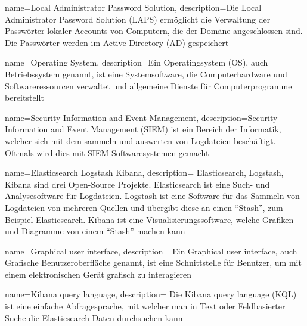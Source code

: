 {
    name=Local Administrator Password Solution,
    description={Die Local Administrator Password Solution (LAPS) ermöglicht die Verwaltung der Passwörter lokaler Accounts von Computern, die der Domäne angeschlossen sind. Die Passwörter werden im Active Directory (AD) gespeichert}
}

{
    name=Operating System,
    description={Ein Operatingsystem (OS), auch Betriebssystem genannt, ist eine Systemsoftware, die Computerhardware und Softwareressourcen verwaltet und allgemeine Dienste für Computerprogramme bereitstellt}
}

{
    name=Security Information and Event Management,
    description={Security Information and Event Management (SIEM) ist ein Bereich der Informatik, welcher sich mit dem sammeln und auswerten von Logdateien beschäftigt.
    Oftmals wird dies mit SIEM Softwaresystemen gemacht}
}

{
    name=Elasticsearch Logstash Kibana,
    description={
        Elasticsearch, Logstash, Kibana sind drei Open-Source Projekte. Elasticsearch ist eine Such- und Analysesoftware für Logdateien.
        Logstash ist eine Software für das Sammeln von Logdateien von mehreren Quellen und übergibt diese an einen ``Stash'', zum Beispiel Elasticsearch.
        Kibana ist eine Visualisierungssoftware, welche Grafiken und Diagramme von einem ``Stash'' machen kann
    }
}

{
    name=Graphical user interface,
    description={
        Ein Graphical user interface, auch Grafische Benutzeroberfläche genannt, ist eine Schnittstelle für Benutzer, um mit einem elektronischen Gerät grafisch zu interagieren
    }
}

{
    name=Kibana query language,
    description={
        Die Kibana query language (KQL) ist eine einfache Abfragesprache, mit welcher man in Text oder Feldbasierter Suche die Elasticsearch Daten durchsuchen kann
    }
}
